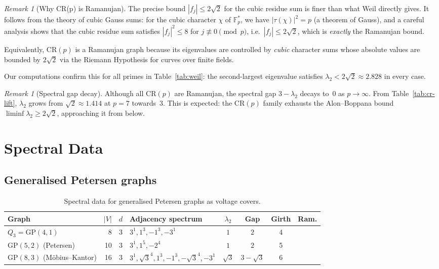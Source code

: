 \documentclass[11pt,a4paper]{article}
\theoremstyle{plain}
\theoremstyle{definition}
\theoremstyle{remark}
\newtheorem{remark}[theorem]{Remark}
\newcommand{\F}{\mathbb{F}}
\newcommand{\CR}{\mathrm{CR}}
\newcommand{\GP}{\mathrm{GP}}
\begin{document}
\begin{remark}[Why CR(p) is Ramanujan]
The precise bound $|f_j| \le 2\sqrt{2}$ for the cubic residue sum is finer
than what Weil directly gives. It follows from the theory of cubic Gauss sums:
for the cubic character $\chi$ of $\F_p^*$, we have $|\tau(\chi)|^2 = p$
(a theorem of Gauss), and a careful analysis shows that the cubic residue sum
satisfies $|f_j|^2 \le 8$ for $j \not\equiv 0 \pmod{p}$, i.e.\
$|f_j| \le 2\sqrt{2}$, which is \emph{exactly} the Ramanujan bound.

Equivalently, $\CR(p)$ is a Ramanujan graph because its eigenvalues are
controlled by \emph{cubic} character sums whose absolute values are bounded by
$2\sqrt{2}$ via the Riemann Hypothesis for curves over finite fields.
\end{remark}

Our computations confirm this for all primes in Table~\ref{tab:weil}: the
second-largest eigenvalue satisfies $\lambda_2 < 2\sqrt{2} \approx 2.828$
in every case.

\begin{remark}[Spectral gap decay]
Although all $\CR(p)$ are Ramanujan, the spectral gap $3 - \lambda_2$
decays to~0 as $p \to \infty$. From Table~\ref{tab:cr-lift}, $\lambda_2$
grows from $\sqrt{2} \approx 1.414$ at $p=7$ towards~3. This is expected:
the $\CR(p)$ family exhausts the Alon--Boppana bound $\liminf \lambda_2 \ge 2\sqrt{2}$,
approaching it from below.
\end{remark}


\section{Spectral Data}
\label{sec:data}

\subsection{Generalised Petersen graphs}

\begin{table}[h]
\centering
\caption{Spectral data for generalised Petersen graphs as voltage covers.}
\label{tab:gp}
\smallskip
\renewcommand{\arraystretch}{1.2}
\small
\begin{tabular}{@{}l r r p{5cm} c c c c@{}}
\toprule
Graph & $|V|$ & $d$ & Adjacency spectrum & $\lambda_2$ & Gap & Girth & Ram. \\
\midrule
$Q_3 = \GP(4,1)$  &  8 & 3 & $3^1, 1^3, {-}1^3, {-}3^1$
  & $1$ & $2$ & 4 & \checkmark \\
$\GP(5,2)$ (Petersen) & 10 & 3 & $3^1, 1^5, {-}2^4$
  & $1$ & $2$ & 5 & \checkmark \\
$\GP(8,3)$ (Möbius--Kantor) & 16 & 3 & $3^1, \sqrt{3}^4, 1^3, {-}1^3, {-}\sqrt{3}^4, {-}3^1$
  & $\sqrt{3}$ & $3 - \sqrt{3}$ & 6 & \checkmark \\
\bottomrule
\end{tabular}
\end{table}
\end{document}
